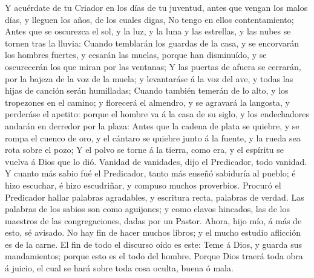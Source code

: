  Y acuérdate de tu Criador en los días de tu juventud,
antes que vengan los malos días, y lleguen los años, de los cuales
digas, No tengo en ellos contentamiento;  Antes que se
oscurezca el sol, y la luz, y la luna y las estrellas, y las nubes se
tornen tras la lluvia:  Cuando temblarán los guardas de la
casa, y se encorvarán los hombres fuertes, y cesarán las muelas, porque
han disminuído, y se oscurecerán los que miran por las ventanas;
 Y las puertas de afuera se cerrarán, por la bajeza de la
voz de la muela; y levantaráse á la voz del ave, y todas las hijas de
canción serán humilladas;  Cuando también temerán de lo
alto, y los tropezones en el camino; y florecerá el almendro, y se
agravará la langosta, y perderáse el apetito: porque el hombre va á la
casa de su siglo, y los endechadores andarán en derredor por la plaza:
 Antes que la cadena de plata se quiebre, y se rompa el
cuenco de oro, y el cántaro se quiebre junto á la fuente, y la rueda sea
rota sobre el pozo;  Y el polvo se torne á la tierra, como
era, y el espíritu se vuelva á Dios que lo dió.  Vanidad
de vanidades, dijo el Predicador, todo vanidad.  Y cuanto
más sabio fué el Predicador, tanto más enseñó sabiduría al pueblo; é
hizo escuchar, é hizo escudriñar, y compuso muchos proverbios.
 Procuró el Predicador hallar palabras agradables, y
escritura recta, palabras de verdad.  Las palabras de los
sabios son como aguijones; y como clavos hincados, las de los maestros
de las congregaciones, dadas por un Pastor.  Ahora, hijo
mío, á más de esto, sé avisado. No hay fin de hacer muchos libros; y el
mucho estudio aflicción es de la carne.  El fin de todo
el discurso oído es este: Teme á Dios, y guarda sus mandamientos; porque
esto es el todo del hombre.  Porque Dios traerá toda obra
á juicio, el cual se hará sobre toda cosa oculta, buena ó mala.
